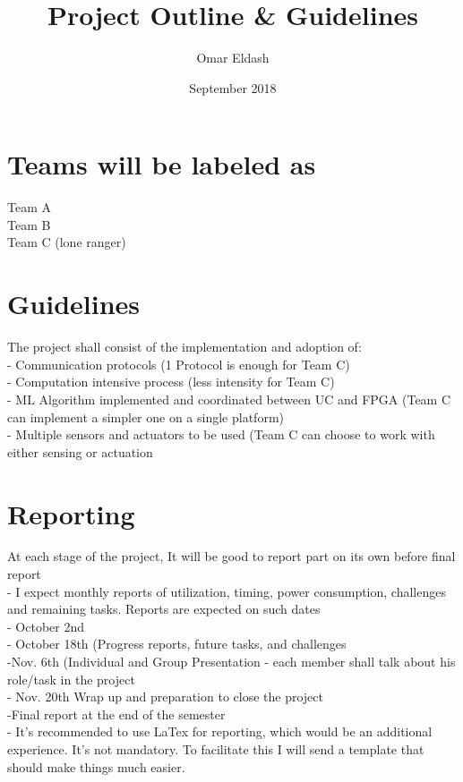 \documentclass{article}
\title{Project Outline \& Guidelines}
\author{Omar Eldash }
\date{September 2018}
\begin{document}
\maketitle

\section{Teams will be labeled as}

Team A \\
Team B \\
Team C (lone ranger) \\

\section{Guidelines}
The project shall consist of the implementation and adoption of:\\
-	Communication protocols (1 Protocol is enough for Team C)\\
-	Computation intensive process (less intensity for Team C)\\
-	ML Algorithm implemented and coordinated between UC and FPGA (Team C can implement a simpler one on a single platform)\\
-	Multiple sensors and actuators to be used (Team C can choose to work with either sensing or actuation\\

\section{Reporting}

At each stage of the project, It will be good to report part on its own before final report \\
-	I expect monthly reports of utilization, timing, power consumption, challenges and remaining tasks. Reports are expected on such dates \\
	-\hspace{1cm}  October 2nd\\
	-\hspace{1cm}  October 18th (Progress reports, future tasks, and challenges\\
    -\hspace{1cm}Nov. 6th (Individual and Group Presentation - each member shall talk about his role/task in the project \\
    -\hspace{1cm}  Nov. 20th Wrap up and preparation to close the project\\
	-\hspace{1cm}Final report at the end of the semester\\
-	It’s recommended to use LaTex for reporting, which would be an additional experience. It’s not mandatory. To facilitate this I will send a template that should make things much easier.\\
\end{document}
